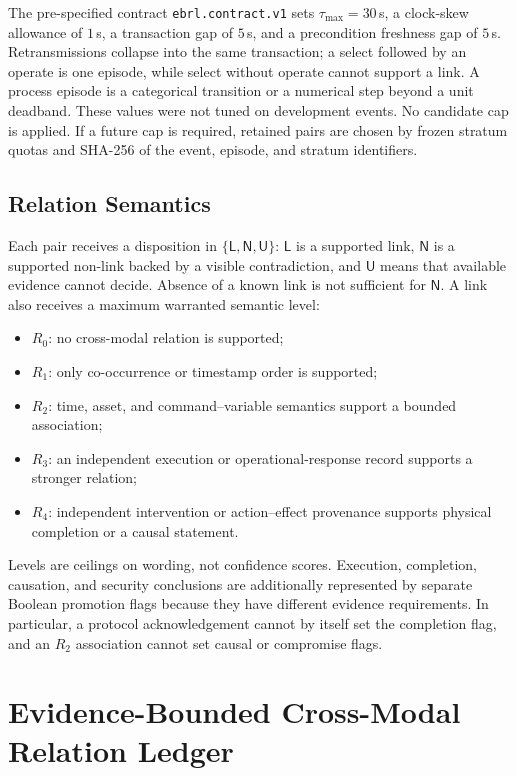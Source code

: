 \documentclass[conference]{IEEEtran}
\begin{document}
The pre-specified contract \texttt{ebrl.contract.v1} sets $\tau_{\max}=30$\,s, a clock-skew allowance of $1$\,s, a transaction gap of $5$\,s, and a precondition freshness gap of $5$\,s. Retransmissions collapse into the same transaction; a select followed by an operate is one episode, while select without operate cannot support a link. A process episode is a categorical transition or a numerical step beyond a unit deadband. These values were not tuned on development events. No candidate cap is applied. If a future cap is required, retained pairs are chosen by frozen stratum quotas and SHA-256 of the event, episode, and stratum identifiers.

\subsection{Relation Semantics}

Each pair receives a disposition in $\{\mathsf{L},\mathsf{N},\mathsf{U}\}$: $\mathsf{L}$ is a supported link, $\mathsf{N}$ is a supported non-link backed by a visible contradiction, and $\mathsf{U}$ means that available evidence cannot decide. Absence of a known link is not sufficient for $\mathsf{N}$. A link also receives a maximum warranted semantic level:
\begin{itemize}
    \item $R_0$: no cross-modal relation is supported;
    \item $R_1$: only co-occurrence or timestamp order is supported;
    \item $R_2$: time, asset, and command--variable semantics support a bounded association;
    \item $R_3$: an independent execution or operational-response record supports a stronger relation;
    \item $R_4$: independent intervention or action--effect provenance supports physical completion or a causal statement.
\end{itemize}
Levels are ceilings on wording, not confidence scores. Execution, completion, causation, and security conclusions are additionally represented by separate Boolean promotion flags because they have different evidence requirements. In particular, a protocol acknowledgement cannot by itself set the completion flag, and an $R_2$ association cannot set causal or compromise flags.

\FloatBarrier
\section{Evidence-Bounded Cross-Modal Relation Ledger}
\label{sec:ebrl}
\end{document}
